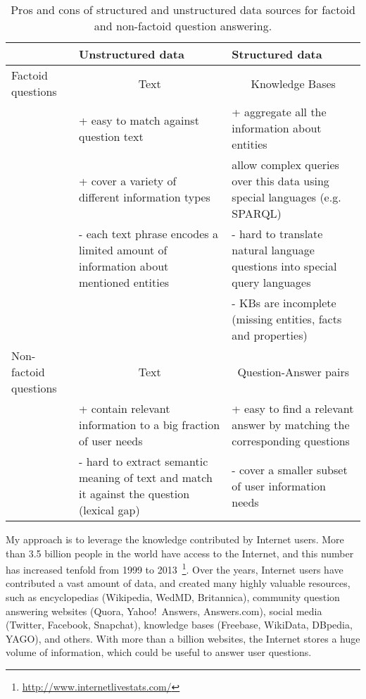\begin{table}[h!t]
	\centering
	\small
	\begin{tabular}{p{2cm}|p{5.3cm}|p{5.3cm}}
		& Unstructured data & Structured data \\
		\hline
		Factoid questions & \multicolumn{1}{|c|}{Text} & \multicolumn{1}{|c}{Knowledge Bases} \\
		& + easy to match against question text & + aggregate all the information about entities\\
		& + cover a variety of different information types & allow complex queries over this data using special languages (e.g. SPARQL) \\
		& - each text phrase encodes a limited amount of information about mentioned entities & - hard to translate natural language questions into special query languages \\
		&  & - KBs are incomplete (missing entities, facts and properties) \\
		\hline
		Non-factoid questions & \multicolumn{1}{|c|}{Text} & \multicolumn{1}{|c}{Question-Answer pairs} \\
		& + contain relevant information to a big fraction of user needs & + easy to find a relevant answer by matching the corresponding questions \\
		& - hard to extract semantic meaning of text and match it against the question (lexical gap) & - cover a smaller subset of user information needs \\
	\end{tabular}
	\caption{Pros and cons of structured and unstructured data sources for factoid and non-factoid question answering.}
	\label{table:intro:data_procons}
\end{table}

My approach is to leverage the knowledge contributed by Internet users. More than 3.5 billion people in the world have access to the Internet, and this number has increased tenfold from 1999 to 2013~\footnote{\href{url}{http://www.internetlivestats.com/}}.
Over the years, Internet users have contributed a vast amount of data, and created many highly valuable resources, such as encyclopedias (Wikipedia, WedMD, Britannica), community question answering websites (Quora, Yahoo!~Answers, Answers.com), social media (Twitter, Facebook, Snapchat), knowledge bases (Freebase, WikiData, DBpedia, YAGO), and others.
With more than a billion websites, the Internet stores a huge volume of information, which could be useful to answer user questions.

